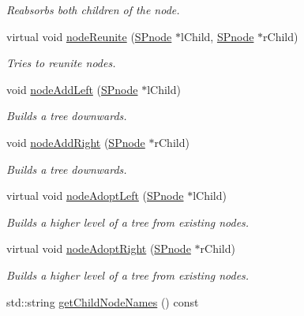 \begin{DoxyCompactItemize}
\begin{DoxyCompactList}\small\item\em \-Reabsorbs both children of the node. \end{DoxyCompactList}\item 
virtual void \hyperlink{classsubpavings_1_1SPnode_a56e03a33b576732f09a12d8b25c48acc}{node\-Reunite} (\hyperlink{classsubpavings_1_1SPnode}{\-S\-Pnode} $\ast$l\-Child, \hyperlink{classsubpavings_1_1SPnode}{\-S\-Pnode} $\ast$r\-Child)
\begin{DoxyCompactList}\small\item\em \-Tries to reunite nodes. \end{DoxyCompactList}\item 
void \hyperlink{classsubpavings_1_1SPnode_a7124dae3fa53ae2d0061deebe9787d7f}{node\-Add\-Left} (\hyperlink{classsubpavings_1_1SPnode}{\-S\-Pnode} $\ast$l\-Child)
\begin{DoxyCompactList}\small\item\em \-Builds a tree downwards. \end{DoxyCompactList}\item 
void \hyperlink{classsubpavings_1_1SPnode_ab826f2bf3a9c492c61ca260c16d99c26}{node\-Add\-Right} (\hyperlink{classsubpavings_1_1SPnode}{\-S\-Pnode} $\ast$r\-Child)
\begin{DoxyCompactList}\small\item\em \-Builds a tree downwards. \end{DoxyCompactList}\item 
virtual void \hyperlink{classsubpavings_1_1SPnode_a42b4b4686ea981149fd7b25a9d720c16}{node\-Adopt\-Left} (\hyperlink{classsubpavings_1_1SPnode}{\-S\-Pnode} $\ast$l\-Child)
\begin{DoxyCompactList}\small\item\em \-Builds a higher level of a tree from existing nodes. \end{DoxyCompactList}\item 
virtual void \hyperlink{classsubpavings_1_1SPnode_a43d542d7c5227d52dfb7b5de97d2b676}{node\-Adopt\-Right} (\hyperlink{classsubpavings_1_1SPnode}{\-S\-Pnode} $\ast$r\-Child)
\begin{DoxyCompactList}\small\item\em \-Builds a higher level of a tree from existing nodes. \end{DoxyCompactList}\item 
std\-::string \hyperlink{classsubpavings_1_1SPnode_a0e7556ec8e2ba5174777c0f6b32573d5}{get\-Child\-Node\-Names} () const 

\end{DoxyCompactItemize}
